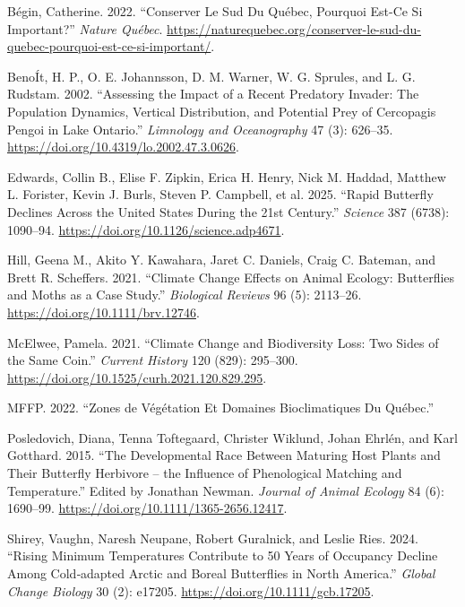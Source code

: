 \documentclass[conference,final,]{IEEEtran}
\newlength{\cslhangindent}
\newenvironment{CSLReferences}[2] %
 {\begin{list}{}{%
  \setlength{\itemindent}{0pt}
  \setlength{\leftmargin}{0pt}
  \setlength{\parsep}{0pt}
  \ifodd #1
   \setlength{\leftmargin}{\cslhangindent}
   \setlength{\itemindent}{-1\cslhangindent}
  \fi
  \setlength{\itemsep}{#2\baselineskip}}}
 {\end{list}}
\begin{document}
\protect{}\label{refs}
\begin{CSLReferences}{1}{0}
Bégin, Catherine. 2022. {``Conserver Le Sud Du {Québec}, Pourquoi Est-Ce
Si Important?''} \emph{Nature Québec}.
\url{https://naturequebec.org/conserver-le-sud-du-quebec-pourquoi-est-ce-si-important/}.

BenoÍt, H. P., O. E. Johannsson, D. M. Warner, W. G. Sprules, and L. G.
Rudstam. 2002. {``Assessing the Impact of a Recent Predatory Invader:
{The} Population Dynamics, Vertical Distribution, and Potential Prey of
{Cercopagis} Pengoi in {Lake} {Ontario}.''} \emph{Limnology and
Oceanography} 47 (3): 626--35.
\url{https://doi.org/10.4319/lo.2002.47.3.0626}.

Edwards, Collin B., Elise F. Zipkin, Erica H. Henry, Nick M. Haddad,
Matthew L. Forister, Kevin J. Burls, Steven P. Campbell, et al. 2025.
{``Rapid Butterfly Declines Across the {United} {States} During the 21st
Century.''} \emph{Science} 387 (6738): 1090--94.
\url{https://doi.org/10.1126/science.adp4671}.

Hill, Geena M., Akito Y. Kawahara, Jaret C. Daniels, Craig C. Bateman,
and Brett R. Scheffers. 2021. {``Climate Change Effects on Animal
Ecology: Butterflies and Moths as a Case Study.''} \emph{Biological
Reviews} 96 (5): 2113--26. \url{https://doi.org/10.1111/brv.12746}.

McElwee, Pamela. 2021. {``Climate {Change} and {Biodiversity} {Loss}:
{Two} {Sides} of the {Same} {Coin}.''} \emph{Current History} 120 (829):
295--300. \url{https://doi.org/10.1525/curh.2021.120.829.295}.

MFFP. 2022. {``Zones de Végétation Et Domaines Bioclimatiques Du
{Québec}.''}

Posledovich, Diana, Tenna Toftegaard, Christer Wiklund, Johan Ehrlén,
and Karl Gotthard. 2015. {``The Developmental Race Between Maturing Host
Plants and Their Butterfly Herbivore -- the Influence of Phenological
Matching and Temperature.''} Edited by Jonathan Newman. \emph{Journal of
Animal Ecology} 84 (6): 1690--99.
\url{https://doi.org/10.1111/1365-2656.12417}.

Shirey, Vaughn, Naresh Neupane, Robert Guralnick, and Leslie Ries. 2024.
{``Rising Minimum Temperatures Contribute to 50 Years of Occupancy
Decline Among Cold‐adapted {Arctic} and Boreal Butterflies in {North}
{America}.''} \emph{Global Change Biology} 30 (2): e17205.
\url{https://doi.org/10.1111/gcb.17205}.

\end{CSLReferences}
\end{document}
